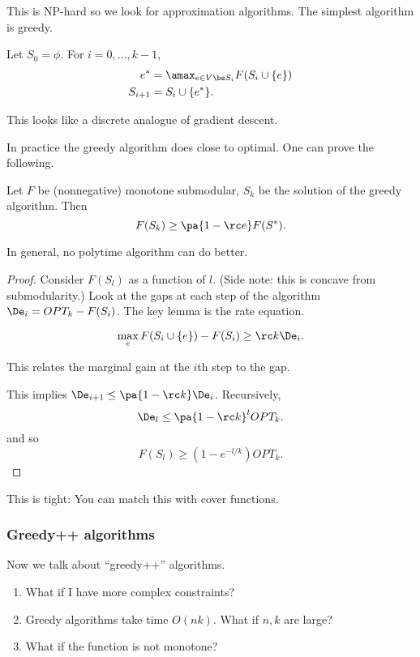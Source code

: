 This is NP-hard so we look for approximation algorithms. The simplest algorithm is greedy.
\begin{alg}
Let $S_0=\phi$. For $i=0,\ldots, k-1$,
\begin{align}
e^* &= \amax_{e\in V\bs S_i} F(S_i\cup \{e\})\\
S_{i+1} &= S_i\cup \{e^*\}.
\end{align}
\end{alg}
This looks like  a discrete analogue of gradient descent.
 
 In practice the greedy algorithm does close to optimal.
 One can prove the following.
 
\begin{thm}
Let $F$ be (nonnegative) monotone submodular, $S_k$ be the solution of the greedy algorithm. Then
$$
F(S_k) \ge \pa{1-\rc e} F(S^*).
$$
\end{thm}
In general, no polytime algorithm can do better.
\begin{proof}
Consider $F(S_l)$ as a function of $l$. (Side note: this is concave from submodularity.)
Look at the gaps at each step of the algorithm $\De_i = OPT_k - F(S_i)$. The key lemma is the rate equation.
\begin{lem} 
$$
\max_e F(S_i\cup \{e\}) - F(S_i) \ge \rc k \De_i.
$$
\end{lem}
This relates the marginal gain at the $i$th step to the gap.

This implies $\De_{i+1} \le \pa{1-\rc k}\De_i$. Recursively, 
$$
\De_l \le \pa{1-\rc k}^l OPT_k.
$$
and so
$$
F(S_l) \ge (1-e^{-l/k}) OPT_k.
$$
\end{proof}
This is tight: You can match this with cover functions.

\subsubsection{Greedy++ algorithms}

Now we talk about ``greedy++'' algorithms.
\begin{enumerate}
\item
What if I have more complex constraints?
\item
Greedy algorithms take time $O(nk)$. What if $n,k$ are large?
\item What if the function is not monotone?
\end{enumerate}

